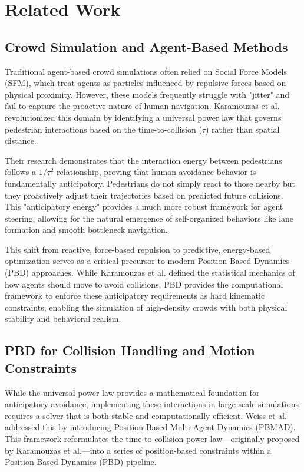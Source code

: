 \section{Related Work}


\subsection{Crowd Simulation and Agent-Based Methods}

Traditional agent-based crowd simulations often relied on Social Force Models (SFM), which treat agents as particles influenced by repulsive forces based on physical proximity. However, these models frequently struggle with "jitter" and fail to capture the proactive nature of human navigation. Karamouzas et al. \cite{Karamouzas2014} revolutionized this domain by identifying a universal power law that governs pedestrian interactions based on the time-to-collision ($\tau$) rather than spatial distance.

Their research demonstrates that the interaction energy between pedestrians follows a $1/\tau^2$ relationship, proving that human avoidance behavior is fundamentally anticipatory. Pedestrians do not simply react to those nearby but they proactively adjust their trajectories based on predicted future collisions. This "anticipatory energy" provides a much more robust framework for agent steering, allowing for the natural emergence of self-organized behaviors like lane formation and smooth bottleneck navigation.

This shift from reactive, force-based repulsion to predictive, energy-based optimization serves as a critical precursor to modern Position-Based Dynamics (PBD) approaches. While Karamouzas et al.\cite{Karamouzas2014} defined the statistical mechanics of how agents should move to avoid collisions, PBD provides the computational framework to enforce these anticipatory requirements as hard kinematic constraints, enabling the simulation of high-density crowds with both physical stability and behavioral realism.

\subsection{PBD for Collision Handling and Motion Constraints} %
While the universal power law provides a mathematical foundation for anticipatory avoidance, implementing these interactions in large-scale simulations requires a solver that is both stable and computationally efficient. Weiss et al. \cite{weiss2019} addressed this by introducing Position-Based Multi-Agent Dynamics (PBMAD). This framework reformulates the time-to-collision power law—originally proposed by Karamouzas et al.\cite{Karamouzas2014}—into a series of position-based constraints within a Position-Based Dynamics (PBD) pipeline.

